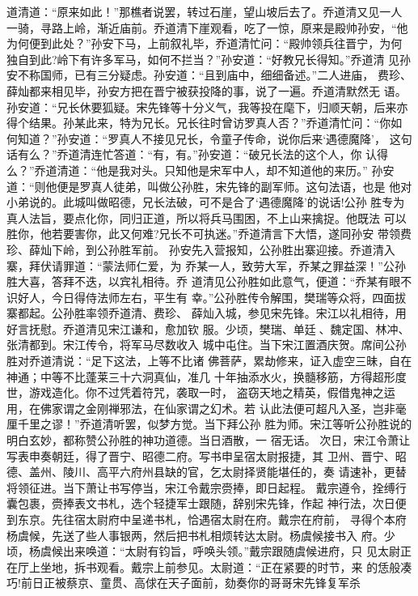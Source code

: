 道清道：“原来如此！”那樵者说罢，转过石崖，望山坡后去了。乔道清又见一人
一骑，寻路上岭，渐近庙前。乔道清下崖观看，吃了一惊，原来是殿帅孙安，“他
为何便到此处？”孙安下马，上前叙礼毕，乔道清忙问：“殿帅领兵往晋宁，为何
独自到此?岭下有许多军马，如何不拦当？”孙安道：“好教兄长得知。”乔道清
见孙安不称国师，已有三分疑虑。孙安道：“且到庙中，细细备述。”二人进庙，
费珍、薛灿都来相见毕，孙安方把在晋宁被获投降的事，说了一遍。乔道清默然无
语。
孙安道：“兄长休要狐疑。宋先锋等十分义气，我等投在麾下，归顺天朝，后来亦
得个结果。孙某此来，特为兄长。兄长往时曾访罗真人否？”乔道清忙问：“你如
何知道？”孙安道：“罗真人不接见兄长，令童子传命，说你后来‘遇德魔降’，
这句话有么？”乔道清连忙答道：“有，有。”孙安道：“破兄长法的这个人，你
认得么？”乔道清道：“他是我对头。只知他是宋军中人，却不知道他的来历。”
孙安道：“则他便是罗真人徒弟，叫做公孙胜，宋先锋的副军师。这句法语，也是
他对小弟说的。此城叫做昭德，兄长法破，可不是合了‘遇德魔降’的说话!公孙
胜专为真人法旨，要点化你，同归正道，所以将兵马围困，不上山来擒捉。他既法
可以胜你，他若要害你，此又何难?兄长不可执迷。”乔道清言下大悟，遂同孙安
带领费珍、薛灿下岭，到公孙胜军前。
孙安先入营报知，公孙胜出寨迎接。乔道清入寨，拜伏请罪道：“蒙法师仁爱，为
乔某一人，致劳大军，乔某之罪益深！”公孙胜大喜，答拜不迭，以宾礼相待。乔
道清见公孙胜如此意气，便道：“乔某有眼不识好人，今日得侍法师左右，平生有
幸。”公孙胜传令解围，樊瑞等众将，四面拔寨都起。公孙胜率领乔道清、费珍、
薛灿入城，参见宋先锋。宋江以礼相待，用好言抚慰。乔道清见宋江谦和，愈加钦
服。少顷，樊瑞、单廷、魏定国、林冲、张清都到。宋江传令，将军马尽数收入
城中屯住。当下宋江置酒庆贺。席间公孙胜对乔道清说：“足下这法，上等不比诸
佛菩萨，累劫修来，证入虚空三昧，自在神通；中等不比蓬莱三十六洞真仙，准几
十年抽添水火，换髓移筋，方得超形度世，游戏造化。你不过凭着符咒，袭取一时，
盗窃天地之精英，假借鬼神之运用，在佛家谓之金刚禅邪法，在仙家谓之幻术。若
认此法便可超凡入圣，岂非毫厘千里之谬！”乔道清听罢，似梦方觉。当下拜公孙
胜为师。宋江等听公孙胜说的明白玄妙，都称赞公孙胜的神功道德。当日酒散，一
宿无话。
次日，宋江令萧让写表申奏朝廷，得了晋宁、昭德二府。写书申呈宿太尉报捷，其
卫州、晋宁、昭德、盖州、陵川、高平六府州县缺的官，乞太尉择贤能堪任的，奏
请速补，更替将领征进。当下萧让书写停当，宋江令戴宗赍捧，即日起程。
戴宗遵令，拴缚行囊包裹，赍捧表文书札，选个轻捷军士跟随，辞别宋先锋，作起
神行法，次日便到东京。先往宿太尉府中呈递书札，恰遇宿太尉在府。戴宗在府前，
寻得个本府杨虞候，先送了些人事银两，然后把书札相烦转达太尉。杨虞候接书入
府。少顷，杨虞候出来唤道：“太尉有钧旨，呼唤头领。”戴宗跟随虞候进府，只
见太尉正在厅上坐地，拆书观看。戴宗上前参见。太尉道：“正在紧要的时节，来
的恁般凑巧!前日正被蔡京、童贯、高俅在天子面前，劾奏你的哥哥宋先锋复军杀
